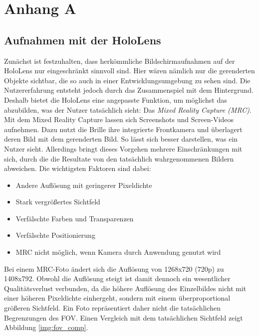 \appendix 
\section{Anhang A}

\subsection{Aufnahmen mit der HoloLens}
Zunächst ist festzuhalten, dass herkömmliche Bildschirmaufnahmen auf der HoloLens nur eingeschränkt sinnvoll sind. Hier wären nämlich nur die gerenderten Objekte sichtbar, die so auch in einer Entwicklungsumgebung zu sehen sind. Die Nutzererfahrung entsteht jedoch durch das Zusammenspiel mit dem Hintergrund. Deshalb bietet die HoloLens eine angepasste Funktion, um möglichst das abzubilden, was der Nutzer tatsächlich sieht: Das \textit{Mixed Reality Capture (MRC)}.\\

Mit dem Mixed Reality Capture lassen sich Screenshots und Screen-Videos aufnehmen. Dazu nutzt die Brille ihre integrierte Frontkamera und überlagert deren Bild mit dem gerenderten Bild. So lässt sich besser darstellen, was ein Nutzer sieht. Allerdings bringt dieses Vorgehen mehrere Einschränkungen mit sich, durch die die Resultate von den tatsächlich wahrgenommenen Bildern abweichen. Die wichtigsten Faktoren sind dabei:

\begin{itemize}
	\setlength{\itemsep}{-1pt}
	\singlespacing
	\item Andere Auflösung mit geringerer Pixeldichte
	\item Stark vergrößertes Sichtfeld
	\item Verfälschte Farben und Transparenzen
	\item Verfälschte Positionierung
	\item MRC nicht möglich, wenn Kamera durch Anwendung genutzt wird
\end{itemize}

Bei einem MRC-Foto ändert sich die Auflösung von 1268x720 (720p) zu 1408x792. Obwohl die Auflösung steigt ist damit dennoch ein wesentlicher Qualitätsverlust verbunden, da die höhere Auflösung des Einzelbildes nicht mit einer höheren Pixeldichte einhergeht, sondern mit einem überproportional größeren Sichtfeld. Ein Foto repräsentiert daher nicht die tatsächlichen Begrenzungen des FOV. Einen Vergleich mit dem tatsächlichen Sichtfeld zeigt Abbildung \ref{img:fov_comp}.\\


